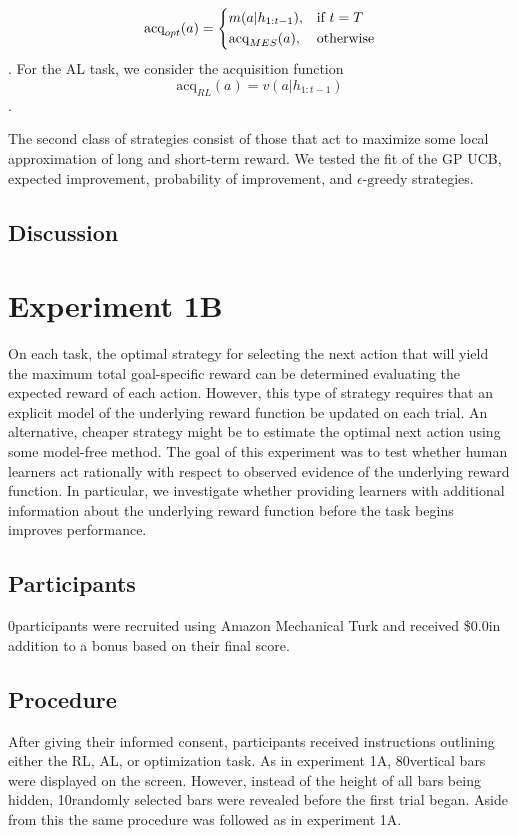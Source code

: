 \documentclass[10pt,letterpaper]{article}
\def\numbars{80}
\def\basepay{\$0.0}
\def\numpartB{0}
\def\numsamples{10}
\begin{document}
	\[\text{acq}_{opt}(a) = 
	\begin{dcases}
	m(a|h_{1:t-1}), & \text{if } t = T\\
	\text{acq}_{MES}(a), & \text{otherwise}
	\end{dcases}
	\]
	.
	For the AL task, we consider the acquisition function
	$$\text{acq}_{RL}(a)  = v(a|h_{1:t-1})$$.
	
	The second class of strategies consist of those that act to maximize some local approximation of long and short-term reward. We tested the fit of the GP UCB, expected improvement, probability of improvement, and $\epsilon \text{-greedy}$ strategies.
	
	\subsection{Discussion}
	
	\section{Experiment 1B}
	
	On each task, the optimal strategy for selecting the next action that will yield the maximum total goal-specific reward can be determined evaluating the expected reward of each action. However, this type of strategy requires that an explicit model of the underlying reward function be updated on each trial. An alternative, cheaper strategy might be to estimate the optimal next action using some model-free method. The goal of this experiment was to test whether human learners act rationally with respect to observed evidence of the underlying reward function. In particular, we investigate whether providing learners with additional information about the underlying reward function before the task begins improves performance.
	
	\subsection{Participants}
	
	\numpartB \space participants were recruited using Amazon Mechanical Turk and received \basepay \space in addition to a bonus based on their final score.
	
	\subsection{Procedure}
	
	After giving their informed consent, participants received instructions outlining either the RL, AL, or optimization task. As in experiment 1A, \numbars \space vertical bars were displayed on the screen. However, instead of the height of all bars being hidden, \numsamples \space randomly selected bars were revealed before the first trial began. Aside from this the same procedure was followed as in experiment 1A.
	
\end{document}
